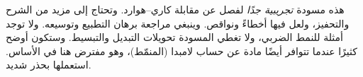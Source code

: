 \documentclass[../../../include/open-logic-chapter]{subfiles}
\begin{document}

\begin{editorial}
  هذه مسودة \emph{تجريبية جدًا} لفصل عن مقابلة كاري--هوارد. وتحتاج إلى
  مزيد من الشرح والتحفيز، ولعل فيها أخطاءً ونواقص. وينبغي مراجعة برهان
  التطبيع وتوسيعه. ولا توجد أمثلة للنمط الضربي، ولا تغطي المسودة تحويلات
  التبديل والتبسيط. وستكون أوضح كثيرًا عندما تتوافر أيضًا مادة عن حساب
  لامبدا (المنمّط)، وهو مفترض هنا في الأساس. استعملها بحذر شديد.
\end{editorial}


\OLEndChapterHook
\end{document}
